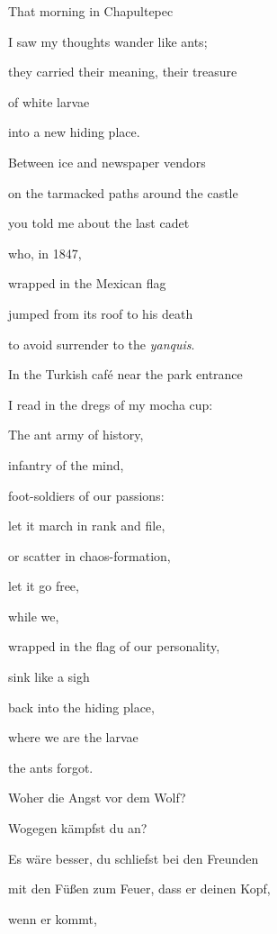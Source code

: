 \bigskip

That morning in Chapultepec

I saw my thoughts wander like ants;

they carried their meaning, their treasure

of white larvae

into a new hiding place.


\bigskip

Between ice and newspaper vendors

on the tarmacked paths around the castle

you told me about the last cadet 

who, in 1847,

wrapped in the Mexican flag

jumped from its roof to his death

to avoid surrender to the \emph{yanquis}.


\bigskip

In the Turkish café near the park entrance

I read in the dregs of my mocha cup:


\bigskip

The ant army of history,

infantry of the mind,

foot-soldiers of our passions:

let it march in rank and file,

or scatter in chaos-formation,

let it go free,


\bigskip

while we,

wrapped in the flag of our personality,

sink like a sigh

back into the hiding place, 

where we are the larvae 

the ants forgot.



\bigskip

Woher die Angst vor dem Wolf?

Wogegen kämpfst du an?


\bigskip

Es wäre besser, du schliefst bei den Freunden

mit den Füßen zum Feuer, dass er deinen Kopf, 

wenn er kommt,

